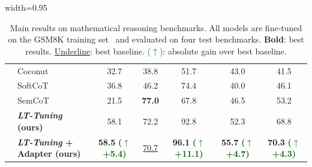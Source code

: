 \documentclass{article}
\newcommand{\increase}[1]{\textcolor{darkgreen}{($\uparrow$ +#1)}}
\theoremstyle{plain}
\theoremstyle{definition}
\theoremstyle{remark}
\begin{document}
\begin{table}[t]
\begin{adjustbox}{width=0.95\textwidth}
\begin{tabular}{llccccc}
& Coconut                        & 32.7 & 38.8 & 51.7 & 43.0 & 41.5 \\
& SoftCoT                        & 36.8 & 46.2 & 74.4 & 40.0 & 46.1 \\
& SemCoT                         & 21.5 & \textbf{77.0} & 67.8 & 46.5 & 53.2 \\
\rowcolor{lightblue!20}
& \textbf{\textit{LT-Tuning} (ours)}            & 58.1 & 72.2 & 92.8 & 52.3 & 68.8 \\
\rowcolor{lightblue!20}
& \textbf{\textit{LT-Tuning} + Adapter (ours)}            & \textbf{58.5} \textbf{\increase{5.4}} & \underline{70.7} & \textbf{96.1} \textbf{\increase{11.1}} & \textbf{55.7} \textbf{\increase{4.7}} & \textbf{70.3} \textbf{\increase{4.3}} \\
\bottomrule
\end{tabular}
\end{adjustbox}
\caption{
Main results on mathematical reasoning benchmarks. All models are fine-tuned on the GSM8K training set~\cite{yu2023metamath} and evaluated on four test benchmarks. \textbf{Bold}: best results. \underline{Underline}: best baseline. \textcolor{darkgreen}{($\uparrow$)}: absolute gain over best baseline.
}
\label{table:main}
\end{table}
\end{document}
